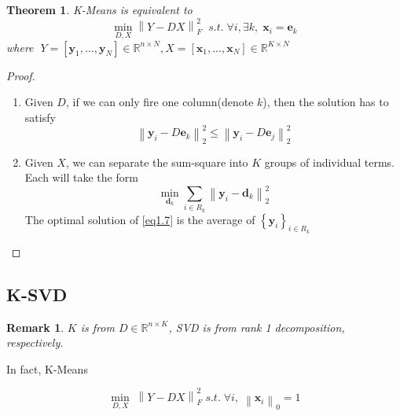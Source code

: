 \documentclass[11pt]{article}
\newtheorem{theorem}{Theorem}[section]
\newtheorem*{remark}{Remark}
\begin{document}
\begin{theorem}
	K-Means is equivalent to
	\begin{equation}
	\mathop {\min }\limits_{D,X} \left\| {Y - DX} \right\|_F^2\;\;s.t.\;\forall i,\exists k,\;{\boldsymbol{x}_i} = {\boldsymbol{e}_k}
	\end{equation} 
	where $\;Y = \left[ {{\boldsymbol{y}_1},...,{\boldsymbol{y}_N}} \right] \in {\mathbb{R}^{n \times N}},X = \left[ {{\boldsymbol{x}_1},...,{\boldsymbol{x}_N}} \right] \in {\mathbb{R}^{K \times N}}$
	\label{thm1.1}
\end{theorem}

\begin{proof}
	\text{}
	\begin{enumerate}
		\item Given $ D $, if we can only fire one column(denote $ k $), then the solution has to satisfy 
		\begin{equation}
		\left\| {{\boldsymbol{y}_i} - D{\boldsymbol{e}_k}} \right\|_2^2 \leqslant \left\| {{\boldsymbol{y}_i} - D{\boldsymbol{e}_j}} \right\|_2^2
		\end{equation}
		\item Given $ X $, we can separate the sum-square into $ K $ groups of individual terms. Each will take the form
		\begin{equation}
		\mathop {\min }\limits_{{\boldsymbol{d}_k}} \sum\limits_{i \in {R_k}} {\left\| {{\boldsymbol{y}_i} - {\boldsymbol{d}_k}} \right\|_2^2} 
		\label{eq1.7}
		\end{equation}
		The optimal solution of \ref{eq1.7} is the average of ${\left\{ {{\boldsymbol{y}_i}} \right\}_{i \in {R_k}}}$
	\end{enumerate}
\end{proof}
\subsection{K-SVD}

\begin{remark}
	$ K $ is from $ D \in \mathbb{R}^{n\times K} $, SVD is from rank 1 decomposition, respectively.
\end{remark}


In fact, K-Means

\begin{equation}
\mathop {\min }\limits_{D,X} \;\left\| {Y - DX} \right\|_F^2\;s.t.\;\forall i,\;{\left\| {{\boldsymbol{x}_i}} \right\|_0} = 1
\end{equation}
\end{document}
